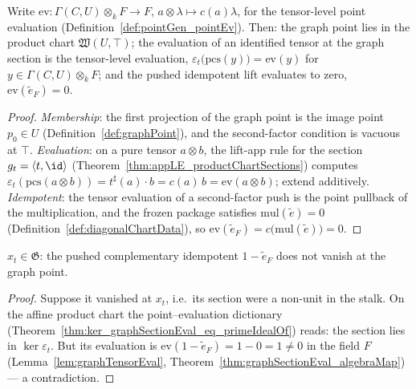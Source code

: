 \begin{lemma}
  \label{lem:graphTensorEval}
  \leanok
  Write \(\mathrm{ev} \colon \Gamma(C,U) \otimes_k F \to F\),
  \(a \otimes \lambda \mapsto c(a)\lambda\), for the tensor-level point evaluation
  (Definition~\ref{def:pointGen_pointEv}). Then:
  the graph point lies in the product chart \(\mathfrak W(U, \top)\);
  the evaluation of an identified tensor at the graph section is the tensor-level
  evaluation,
  \(\varepsilon_t\bigl(\mathrm{pcs}(y)\bigr) = \mathrm{ev}(y)\) for
  \(y \in \Gamma(C,U) \otimes_k F\); and the pushed idempotent lift evaluates to zero,
  \(\mathrm{ev}(\tilde e_F) = 0\).
\end{lemma}
\begin{proof}
  \leanok
  \emph{Membership}: the first projection of the graph point is the image point
  \(p_0 \in U\) (Definition~\ref{def:graphPoint}), and the second-factor condition is
  vacuous at \(\top\). \emph{Evaluation}: on a pure tensor \(a \otimes b\), the lift-app
  rule for the section \(g_t = \langle t, \id\rangle\)
  (Theorem~\ref{thm:appLE_productChartSections}) computes
  \(\varepsilon_t(\mathrm{pcs}(a \otimes b)) = t^{\sharp}(a) \cdot b = c(a)\,b =
  \mathrm{ev}(a \otimes b)\); extend additively. \emph{Idempotent}: the tensor evaluation
  of a second-factor push is the point pullback of the multiplication, and the frozen
  package satisfies \(\mathrm{mul}(\tilde e) = 0\)
  (Definition~\ref{def:diagonalChartData}), so
  \(\mathrm{ev}(\tilde e_F) = c\bigl(\mathrm{mul}(\tilde e)\bigr) = 0\).
\end{proof}

\begin{theorem}
  \label{thm:graphPoint_mem_graphChart}
  \leanok
  \(x_t \in \mathfrak G\): the pushed complementary idempotent \(1 - \tilde e_F\) does not
  vanish at the graph point.
\end{theorem}
\begin{proof}
  \leanok
  Suppose it vanished at \(x_t\), i.e.\ its section were a non-unit in the stalk. On the
  affine product chart the point--evaluation dictionary
  (Theorem~\ref{thm:ker_graphSectionEval_eq_primeIdealOf}) reads: the section lies in
  \(\ker\varepsilon_t\). But its evaluation is
  \(\mathrm{ev}(1 - \tilde e_F) = 1 - 0 = 1 \neq 0\) in the field \(F\)
  (Lemma~\ref{lem:graphTensorEval}, Theorem~\ref{thm:graphSectionEval_algebraMap}) — a
  contradiction.
\end{proof}

